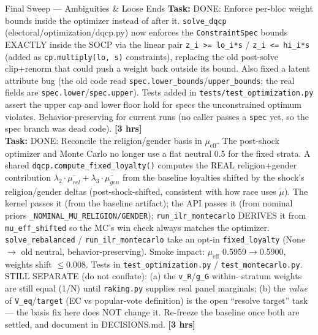 \documentclass[11pt]{article}
\newcommand{\hrs}[1]{\textbf{[#1 hrs]}}
\newcommand{\task}[2]{%
  \noindent\textbf{Task:} #1 \hfill \hrs{#2}\\}
\begin{document}
\begin{taskbox}{Final Sweep --- Ambiguities \& Loose Ends}
\task{DONE: Enforce per-bloc weight bounds inside the optimizer instead of after
  it. \texttt{solve\_dqcp} (electoral/optimization/dqcp.py) now enforces the
  \texttt{ConstraintSpec} bounds EXACTLY inside the SOCP via the linear pair
  \texttt{z\_i >= lo\_i*s} / \texttt{z\_i <= hi\_i*s} (added as
  \texttt{cp.multiply(lo, s)} constraints), replacing the old post-solve
  clip+renorm that could push a weight back outside its bound. Also fixed a latent
  attribute bug (the old code read \texttt{spec.lower\_bounds}/\texttt{upper\_bounds};
  the real fields are \texttt{spec.lower}/\texttt{spec.upper}). Tests added in
  \texttt{tests/test\_optimization.py} assert the upper cap and lower floor hold
  for specs the unconstrained optimum violates. Behavior-preserving for current
  runs (no caller passes a \texttt{spec} yet, so the spec branch was dead code).}{3}

\task{DONE: Reconcile the religion/gender basis in $\mu_{\text{eff}}$. The
  post-shock optimizer and Monte Carlo no longer use a flat neutral 0.5 for the
  fixed strata. A shared \texttt{dqcp.compute\_fixed\_loyalty()} computes the REAL
  religion+gender contribution
  $\lambda_2\!\cdot\!\overline{\mu_{rel}} + \lambda_3\!\cdot\!\overline{\mu_{gen}}$
  from the baseline loyalties shifted by the shock's religion/gender deltas
  (post-shock-shifted, consistent with how race uses $\tilde\mu$). The kernel
  passes it (from the baseline artifact); the API passes it (from nominal priors
  \texttt{\_NOMINAL\_MU\_RELIGION/GENDER}); \texttt{run\_ilr\_montecarlo} DERIVES
  it from \texttt{mu\_eff\_shifted} so the MC's win check always matches the
  optimizer. \texttt{solve\_rebalanced} / \texttt{run\_ilr\_montecarlo} take an
  opt-in \texttt{fixed\_loyalty} (None $\to$ old neutral, behavior-preserving).
  Smoke impact: $\mu_{\text{eff}}$ 0.5959$\to$0.5900, weights shift $\le 0.008$.
  Tests in \texttt{test\_optimization.py} / \texttt{test\_montecarlo.py}.
  STILL SEPARATE (do not conflate): (a) the \texttt{v\_R}/\texttt{g\_G} within-
  stratum weights are still equal (1/N) until \texttt{raking.py} supplies real
  panel marginals; (b) the \emph{value} of \texttt{V\_eq}/\texttt{target} (EC vs
  popular-vote definition) is the open ``resolve target'' task --- the basis fix
  here does NOT change it. Re-freeze the baseline once both are settled, and
  document in DECISIONS.md.}{3}


\end{taskbox}
\end{document}
